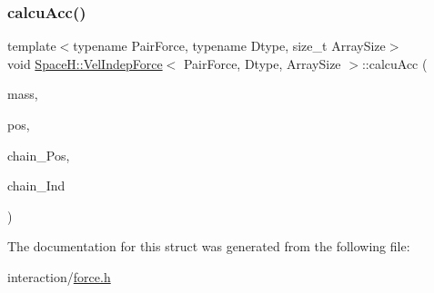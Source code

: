 \subsubsection{\texorpdfstring{calcu\+Acc()}{calcuAcc()}\hspace{0.1cm}{\footnotesize\ttfamily [2/2]}}
{\footnotesize\ttfamily template$<$typename Pair\+Force, typename Dtype, size\+\_\+t Array\+Size$>$ \\
void \mbox{\hyperlink{struct_space_h_1_1_vel_indep_force}{Space\+H\+::\+Vel\+Indep\+Force}}$<$ Pair\+Force, Dtype, Array\+Size $>$\+::calcu\+Acc (\begin{DoxyParamCaption}\item[{const \mbox{\hyperlink{struct_space_h_1_1_vel_indep_force_a05d04af454b5217024f5fff45d7e4d32}{Scalar\+Array}} \&}]{mass,  }\item[{const \mbox{\hyperlink{struct_space_h_1_1_vel_indep_force_a6b4e8ca988b015e7f956f015991ecd80}{Vector\+Array}} \&}]{pos,  }\item[{const \mbox{\hyperlink{struct_space_h_1_1_vel_indep_force_a6b4e8ca988b015e7f956f015991ecd80}{Vector\+Array}} \&}]{chain_\+Pos,  }\item[{const \mbox{\hyperlink{struct_space_h_1_1_vel_indep_force_ac8dcda8c288da58df2f706259eeae0a9}{Index\+Array}} \&}]{chain_\+Ind }\end{DoxyParamCaption})\hspace{0.3cm}{\ttfamily [inline]}}



The documentation for this struct was generated from the following file\+:\begin{DoxyCompactItemize}
\item 
interaction/\mbox{\hyperlink{force_8h}{force.\+h}}\end{DoxyCompactItemize}
